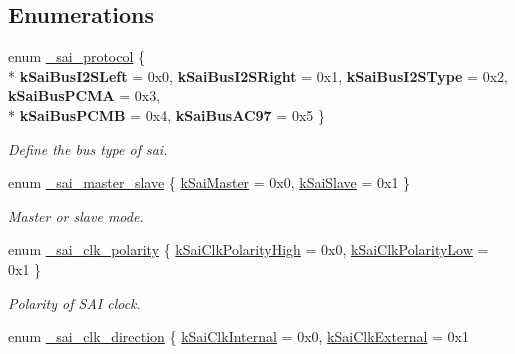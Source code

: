 \subsection*{Enumerations}
\begin{DoxyCompactItemize}
\item 
enum \hyperlink{group__sai__hal_ga5a56e024c1155a61c6f46513e57b473f}{\+\_\+sai\+\_\+protocol} \{ \\*
{\bfseries k\+Sai\+Bus\+I2\+S\+Left} = 0x0, 
{\bfseries k\+Sai\+Bus\+I2\+S\+Right} = 0x1, 
{\bfseries k\+Sai\+Bus\+I2\+S\+Type} = 0x2, 
{\bfseries k\+Sai\+Bus\+P\+C\+MA} = 0x3, 
\\*
{\bfseries k\+Sai\+Bus\+P\+C\+MB} = 0x4, 
{\bfseries k\+Sai\+Bus\+A\+C97} = 0x5
 \}\hypertarget{group__sai__hal_ga5a56e024c1155a61c6f46513e57b473f}{}\label{group__sai__hal_ga5a56e024c1155a61c6f46513e57b473f}
\begin{DoxyCompactList}\small\item\em Define the bus type of sai. \end{DoxyCompactList}
\item 
enum \hyperlink{group__sai__hal_gab94a8b97a2fa0881a3259d1f514fcf40}{\+\_\+sai\+\_\+master\+\_\+slave} \{ \hyperlink{group__sai__hal_ggab94a8b97a2fa0881a3259d1f514fcf40a200599ee4e9400d3322c3d9e0cf539fe}{k\+Sai\+Master} = 0x0, 
\hyperlink{group__sai__hal_ggab94a8b97a2fa0881a3259d1f514fcf40a06cc7d3d27e7b3e10b41e579f7b21e06}{k\+Sai\+Slave} = 0x1
 \}\begin{DoxyCompactList}\small\item\em Master or slave mode. \end{DoxyCompactList}
\item 
enum \hyperlink{group__sai__hal_ga336516f5afeec0ab04b69f7a2efbc3cc}{\+\_\+sai\+\_\+clk\+\_\+polarity} \{ \hyperlink{group__sai__hal_gga336516f5afeec0ab04b69f7a2efbc3cca65dded865c186dccbfa803e53cd87ce8}{k\+Sai\+Clk\+Polarity\+High} = 0x0, 
\hyperlink{group__sai__hal_gga336516f5afeec0ab04b69f7a2efbc3ccaa89055cd957234b15a927b692e4f9d71}{k\+Sai\+Clk\+Polarity\+Low} = 0x1
 \}\begin{DoxyCompactList}\small\item\em Polarity of S\+AI clock. \end{DoxyCompactList}
\item 
enum \hyperlink{group__sai__hal_ga249de9addcc563f1e381e4d46776e9a9}{\+\_\+sai\+\_\+clk\+\_\+direction} \{ \hyperlink{group__sai__hal_gga249de9addcc563f1e381e4d46776e9a9adfd69ed18b8cf26fd6e90ba83c2c50e6}{k\+Sai\+Clk\+Internal} = 0x0, 
\hyperlink{group__sai__hal_gga249de9addcc563f1e381e4d46776e9a9a3f73c910e6c4c301472a346692994e4a}{k\+Sai\+Clk\+External} = 0x1

\end{DoxyCompactItemize}
